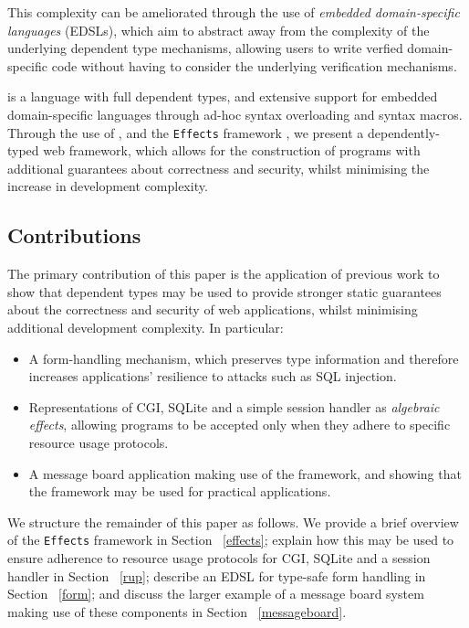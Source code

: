 \documentclass[preprint]{sigplanconf}
\begin{document}
This complexity can be ameliorated through the use of \textit{embedded domain-specific languages} (EDSLs), which aim to abstract away from the complexity of the underlying dependent type mechanisms, allowing users to write verfied domain-specific code without having to consider the underlying verification mechanisms.   %

\idris{} \cite{brady2011idris} is a language with full dependent types, and extensive support for embedded domain-specific languages through ad-hoc syntax overloading and syntax macros. Through the use of \idris{}, and the \texttt{Effects} framework \cite{brady:effects}, we present a dependently-typed web framework, which allows for the construction of programs with additional guarantees about correctness and security, whilst minimising the increase in development complexity. 

\subsection{Contributions}
The primary contribution of this paper is the application of previous work to show that dependent types may be used to provide stronger static guarantees about the correctness and security of web applications, whilst minimising additional development complexity. In particular:

\begin{itemize}
\item A form-handling mechanism, which preserves type information and therefore increases applications' resilience to attacks such as SQL injection.
\item Representations of CGI, SQLite and a simple session handler as \textit{algebraic effects}, allowing programs to be accepted only when they adhere to specific resource usage protocols.
\item A message board application making use of the framework, and showing that the framework may be used for practical applications.
\end{itemize}

We structure the remainder of this paper as follows. We provide a brief overview of the \texttt{Effects} framework in Section ~\ref{effects}; explain how this may be used to ensure adherence to resource usage protocols for CGI, SQLite and a session handler in Section ~\ref{rup}; describe an EDSL for type-safe form handling in Section ~\ref{form}; and discuss the larger example of a message board system making use of these components in Section ~\ref{messageboard}.
\end{document}
